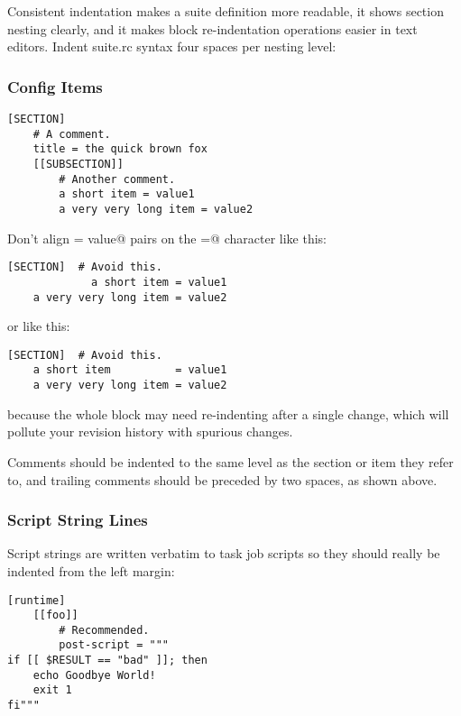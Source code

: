 Consistent indentation makes a suite definition more readable, it shows section
nesting clearly, and it makes block re-indentation operations easier in text
editors. Indent suite.rc syntax four spaces per nesting level:

\subsubsection{Config Items}

\lstset{language=suiterc}
\begin{lstlisting}
[SECTION]
    # A comment.
    title = the quick brown fox
    [[SUBSECTION]]
        # Another comment.
        a short item = value1
        a very very long item = value2
\end{lstlisting}

Don't align \lstinline@item = value@ pairs on the \lstinline@=@ character
like this:

\lstset{language=suiterc}
\begin{lstlisting}
[SECTION]  # Avoid this.
             a short item = value1
    a very very long item = value2
\end{lstlisting}

or like this:

\lstset{language=suiterc}
\begin{lstlisting}
[SECTION]  # Avoid this.
    a short item          = value1
    a very very long item = value2
\end{lstlisting}

because the whole block may need re-indenting after a single change, which will
pollute your revision history with spurious changes.

Comments should be indented to the same level as the section or item they refer
to, and trailing comments should be preceded by two spaces, as shown above.

\subsubsection{Script String Lines}

Script strings are written verbatim to task job scripts so they should really
be indented from the left margin:

\lstset{language=suiterc}
\begin{lstlisting}
[runtime]
    [[foo]]
        # Recommended.
        post-script = """
if [[ $RESULT == "bad" ]]; then
    echo Goodbye World!
    exit 1
fi"""
\end{lstlisting}

